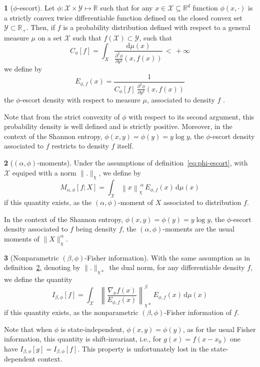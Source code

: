 \documentclass[english,sort&compress]{elsarticle}
\theoremstyle{definition}
\newtheorem{defn}{\protect\definitionname}
\theoremstyle{plain}
\theoremstyle{plain}
\providecommand{\definitionname}{Definition}
\def\dmu{\mathrm{d}\mu}
\def\Rset{\mathbb{R}}
\def\X{\mathcal{X}}
\def\Y{\mathcal{Y}}
\begin{document}
\begin{defn}[$\phi$-escort]\label{def:phi-escort}
  Let $\phi: \X \times  \Y \mapsto \Rset$ such that for any  $x \in \X \subseteq
  \Rset^d$ function  $\phi(x,\cdot)$ is  a strictly convex  twice differentiable
  function defined on the closed convex  set $\Y \subset \Rset_+$.  Then, if $f$
  is a probability distribution defined  with respect to a general measure $\mu$
  on a set $\X$ such that $f(\X) \subset \Y$, such that
  \[
  C_\phi[f]    =     \int_X    \frac{\dmu(x)}{\frac{\partial^2    \phi}{\partial
      y^2}(x,f(x))} \, < \, + \infty
  \]
  we define by
  \begin{equation}\label{eq:phi-escort}
    E_{\phi,f}(x) = \frac{1}{\displaystyle C_\phi[f] \: \frac{\partial^2
    \phi}{\partial y^2}(x,f(x))}
  \end{equation}
  the $\phi$-escort density with respect to measure $\mu$, associated to density
  $f$ .
\end{defn}
%
Note  that from  the  strict convexity  of  $\phi$ with  respect  to its  second
argument,   this  probability   density  is   well  defined   and   is  strictly
positive. Moreover, in the context  of the Shannon entropy, $\phi(x,y) = \phi(y)
= y  \log y$, the $\phi$-escort  density associated to $f$  restricts to density
$f$ itself.

\begin{defn}[$(\alpha,\phi)$-moments]\label{def:phi-moment}
  Under the assumptions of definition~\ref{eq:phi-escort}, with $\X$ equiped with
  a norm $\|.\|_\chi$, we define by
  \begin{equation}\label{eq:phi-moment}
  M_{\alpha,\phi}[f;X] = \int_\X \left\| x \right\|_\chi^{\: \alpha} \,
  E_{\phi,f}(x) \, \dmu(x)
  \end{equation}
  if this  quantity exists, as  the $(\alpha,\phi)$-moment of $X$  associated to
  distribution $f$.
\end{defn}
%
In the  context of the Shannon  entropy, $\phi(x,y) =  \phi(y) = y \log  y$, the
$\phi$-escort   density    associated   to   $f$   being    density   $f$,   the
$(\alpha,\phi)$-moments are the usual moments of $\|X\|_\chi^\alpha$.

\begin{defn}[Nonparametric $(\beta,\phi)$-Fisher information]\label{def:np-phi-Fisher}
  With the  same assumption  as in definition~\ref{def:phi-moment},  denoting by
  $\|.\|_{\chi*}$ the dual  norm, for any differentiable density  $f$, we define
  the quantity
  \begin{equation}\label{eq:np-phi-Fisher}
    I_{\beta,\phi}[f] = \int_\X \left\| \frac{\nabla_x f(x)}{E_{\phi,f}(x)}
    \right\|_{\chi*}^\beta \, E_{\phi,f}(x) \, \dmu(x)
  \end{equation}
  if   this  quantity   exists,  as   the   nonparametric  $(\beta,\phi)$-Fisher
  information of $f$.
\end{defn}
%
Note that  when $\phi$ is state-independent,  $\phi(x,y) = \phi(y)$,  as for the
usual Fisher information,  this quantity is shift-invariant, i.e.,  for $g(x) =
f(x-x_0)$  one have  $I_{\beta,\phi}[g] =  I_{\beta,\phi}[f]$. This  property is
unfortunately lost in the state-dependent context.
\end{document}
